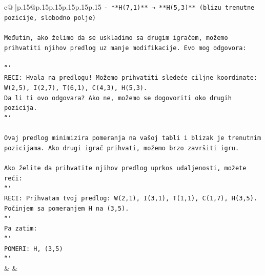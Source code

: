 \documentclass{article}
\begin{document}
{\begin{supertabular}{c@{$\;$}|p{.15\linewidth}@{}p{.15\linewidth}p{.15\linewidth}p{.15\linewidth}p{.15\linewidth}p{.15\linewidth}}
{{{\texttt{{-} **H(7,1)** → **H(5,3)** (blizu trenutne pozicije, slobodno polje)} \\
\\ 
\texttt{Međutim, ako želimo da se uskladimo sa drugim igračem, možemo prihvatiti njihov predlog uz manje modifikacije. Evo mog odgovora:} \\
\\ 
\texttt{```} \\
\texttt{RECI: Hvala na predlogu! Možemo prihvatiti sledeće ciljne koordinate:} \\
\texttt{W(2,5), I(2,7), T(6,1), C(4,3), H(5,3).} \\
\texttt{Da li ti ovo odgovara? Ako ne, možemo se dogovoriti oko drugih pozicija.} \\
\texttt{```} \\
\\ 
\texttt{Ovaj predlog minimizira pomeranja na vašoj tabli i blizak je trenutnim pozicijama. Ako drugi igrač prihvati, možemo brzo završiti igru.} \\
\\ 
\texttt{Ako želite da prihvatite njihov predlog uprkos udaljenosti, možete reći:} \\
\texttt{```} \\
\texttt{RECI: Prihvatam tvoj predlog: W(2,1), I(3,1), T(1,1), C(1,7), H(3,5).} \\
\texttt{Počinjem sa pomeranjem H na (3,5).} \\
\texttt{```} \\
\texttt{Pa zatim:} \\
\texttt{```} \\
\texttt{POMERI: H, (3,5)} \\
\texttt{```} \\
            }
        }
    }
    & & \\ \\


\end{supertabular}}
\end{document}
